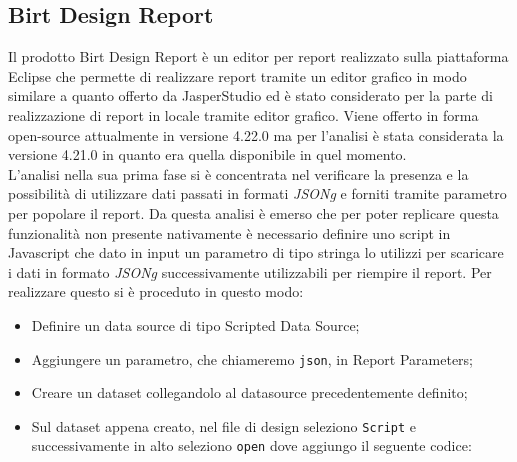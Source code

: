     \subsection{Birt Design Report}
    \label{sec:birt-design-report}
    Il prodotto Birt Design Report è un editor per report realizzato sulla piattaforma Eclipse che permette di realizzare report tramite un editor grafico in modo similare a quanto offerto da JasperStudio ed è stato considerato per la parte di realizzazione di report in locale tramite editor grafico.
    Viene offerto in forma open-source attualmente in versione 4.22.0 ma per l'analisi è stata considerata la versione 4.21.0 in quanto era quella disponibile in quel momento.\\
    L'analisi nella sua prima fase si è concentrata nel verificare la presenza e la possibilità di utilizzare dati passati in formati \emph{\gls{JSONg}} e forniti tramite parametro per popolare il report. 
    Da questa analisi è emerso che per poter replicare questa funzionalità non presente nativamente è necessario definire uno script in Javascript che dato in input un parametro di tipo stringa lo utilizzi per scaricare i dati in formato \emph{\gls{JSONg}} successivamente utilizzabili per riempire il report. 
    Per realizzare questo si è proceduto in questo modo:
    \begin{itemize}
        \item Definire un data source di tipo Scripted Data Source;
        \item Aggiungere un parametro, che chiameremo \texttt{json}, in Report Parameters;
        \item Creare un dataset collegandolo al datasource precedentemente definito;
        \item Sul dataset appena creato, nel file di design seleziono \texttt{Script} e successivamente in alto seleziono \texttt{open} dove aggiungo il seguente codice:

    \end{itemize}


